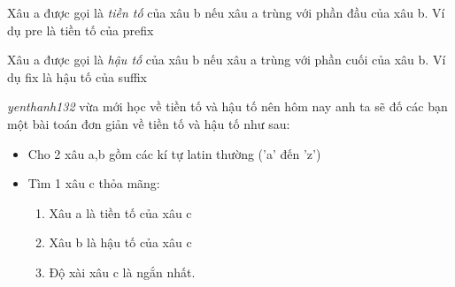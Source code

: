 Xâu a được gọi là   \emph{    tiền tố   }   của xâu b nếu xâu a trùng với phần đầu của xâu b. Ví dụ       pre      là tiền tố của       prefix   

   Xâu a được gọi là   \emph{    hậu tố   }   của xâu b nếu xâu a trùng với phần cuối của xâu b. Ví dụ       fix      là hậu tố của       suffix   

\emph{    yenthanh132   }   vừa mới học về tiền tố và hậu tố nên hôm nay anh ta sẽ đố các bạn một bài toán đơn giản về tiền tố và hậu tố như sau:  
\begin{itemize}
	\item     Cho 2 xâu a,b gồm các kí tự latin thường ('a' đến 'z')   
	\item     Tìm 1 xâu c thỏa mãng:    
\begin{enumerate}
	\item       Xâu a là tiền tố của xâu c     
	\item       Xâu b là hậu tố của xâu c     
	\item       Độ xài xâu c là ngắn nhất.     
\end{enumerate}
\end{itemize}
\begin{enumerate}
\end{enumerate}